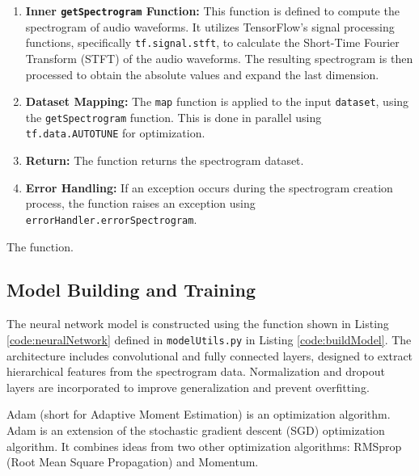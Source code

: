 \begin{enumerate}
	\item \textbf{Inner \texttt{getSpectrogram} Function:} This function is defined to compute the spectrogram of audio waveforms. It utilizes TensorFlow's signal processing functions, specifically \texttt{tf.signal.stft}, to calculate the Short-Time Fourier Transform (STFT) of the audio waveforms. The resulting spectrogram is then processed to obtain the absolute values and expand the last dimension.
	
	\item \textbf{Dataset Mapping:} The \texttt{map} function is applied to the input \texttt{dataset}, using the \texttt{getSpectrogram} function. This is done in parallel using \texttt{tf.data.AUTOTUNE} for optimization.
	
	\item \textbf{Return:} The function returns the spectrogram dataset.
	
	\item \textbf{Error Handling:} If an exception occurs during the spectrogram creation process, the function raises an exception using \texttt{errorHandler.errorSpectrogram}.
\end{enumerate}


\begin{code}[h!]
	    
	
	\caption{The  function.}
	\label{code:createSpectrogramDataset}
\end{code}


\subsection{Model Building and Training}

The neural network model is constructed using the  function shown in Listing \ref{code:neuralNetwork} defined in \texttt{modelUtils.py} in Listing \ref{code:buildModel}. The architecture includes convolutional and fully connected layers, designed to extract hierarchical features from the spectrogram data. Normalization and dropout layers are incorporated to improve generalization and prevent overfitting.

Adam (short for Adaptive Moment Estimation) is an optimization algorithm. Adam is an extension of the stochastic gradient descent (SGD) optimization algorithm. It combines ideas from two other optimization algorithms: RMSprop (Root Mean Square Propagation) and Momentum.

